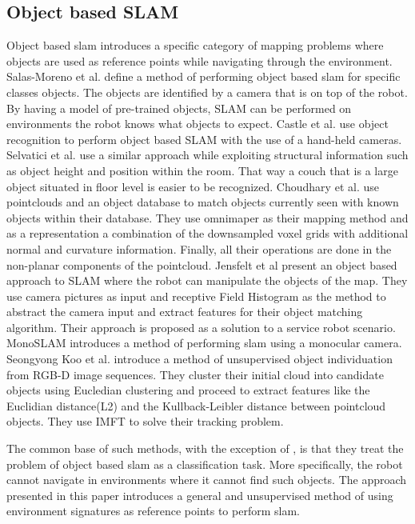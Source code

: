 \documentclass[twoside,hidelinks]{article}
\begin{document}
\subsection{Object based SLAM}


Object based slam introduces a specific category of mapping problems where objects are used as reference points while navigating through the environment.
Salas-Moreno et al.\cite{slam++} define a method of performing object based slam for specific classes objects. The objects are identified by a camera that is on top of the robot. By having a model of pre-trained objects, SLAM can be performed on environments the robot knows what objects to expect.
Castle et al. use object recognition to perform object based SLAM with the use of a hand-held cameras. Selvatici et al.\cite{objslam} use a similar approach while exploiting structural information such as object height and position within the room. That way a couch that is a large object situated in floor level is easier to be recognized.
Choudhary et al.\cite{objectpointslam} use pointclouds and an object database to match objects currently seen with known objects within their database. They use omnimaper\cite{omnimaper} as their mapping method and as a representation a combination of the downsampled  voxel grids with additional normal and curvature information.  Finally, all their operations are done in the non-planar components of the pointcloud.
Jensfelt et al\cite{objslam} present an object based approach to SLAM where the robot can manipulate the objects of the map. They use camera pictures as input and receptive Field Histogram as the method to abstract the camera input and extract features for their object matching algorithm. Their approach is proposed as a solution to a service robot scenario.
MonoSLAM\cite{monoslam} introduces a method of performing slam using a monocular camera. 
Seongyong Koo et al.\cite{objectDisc} introduce a method of unsupervised object individuation from RGB-D image sequences. They cluster their initial cloud into candidate objects using Eucledian clustering and proceed to extract features like the Euclidian distance(L2) and the Kullback-Leibler distance between pointcloud objects. They use IMFT to solve their tracking problem.

The common base of such methods, with the exception of \cite{objectDisc}, is that they treat the problem of object based slam as a classification task. More specifically, the robot cannot navigate in environments where it cannot find such objects.
The approach presented in this paper introduces a general and unsupervised method of using environment signatures as reference points to perform slam.
\end{document}
